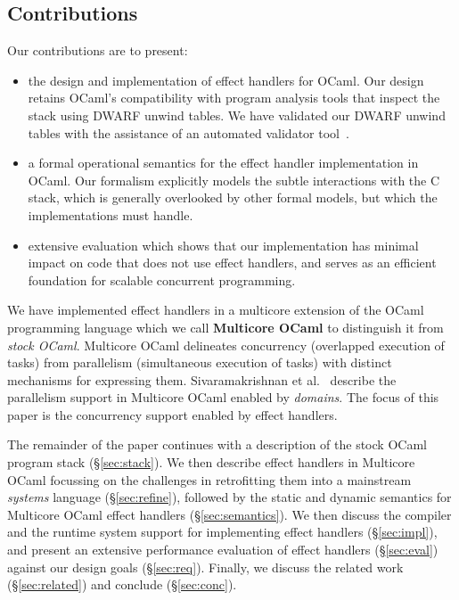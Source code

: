 \documentclass[sigplan,screen]{acmart}
\begin{document}
\subsection{Contributions}

Our contributions are to present:

\begin{itemize}
	\item the design and implementation of effect handlers for OCaml. Our design
		retains OCaml's compatibility with program analysis tools that inspect the
		stack using DWARF unwind tables. We have validated our DWARF unwind tables
		with the assistance of an automated validator tool~\cite{Bastian19}.
	\item a formal operational semantics for the effect handler implementation in
		OCaml. Our formalism explicitly models the subtle interactions with the C
		stack, which is generally overlooked by other formal models, but which the
		implementations must handle.
	\item extensive evaluation which shows that our implementation has minimal
		impact on code that does not use effect handlers, and serves as an
		efficient foundation for scalable concurrent programming.
\end{itemize}

We have implemented effect handlers in a multicore extension of the OCaml
programming language which we call \textbf{Multicore OCaml} to distinguish it
from \emph{stock OCaml}. Multicore OCaml delineates concurrency (overlapped
execution of tasks) from parallelism (simultaneous execution of tasks) with
distinct mechanisms for expressing them. Sivaramakrishnan et
al.~\cite{Sivaramakrishnan20} describe the parallelism support in Multicore
OCaml enabled by \emph{domains}. The focus of this paper is the concurrency
support enabled by effect handlers.

The remainder of the paper continues with a description of the stock OCaml
program stack (\S\ref{sec:stack}). We then describe effect handlers in
Multicore OCaml focussing on the challenges in retrofitting them into a
mainstream \emph{systems} language (\S\ref{sec:refine}), followed by the static
and dynamic semantics for Multicore OCaml effect handlers
(\S\ref{sec:semantics}). We then discuss the compiler and the runtime system
support for implementing effect handlers (\S\ref{sec:impl}), and present an
extensive performance evaluation of effect handlers (\S\ref{sec:eval}) against
our design goals (\S\ref{sec:req}). Finally, we discuss the related work
(\S\ref{sec:related}) and conclude (\S\ref{sec:conc}).
\end{document}
